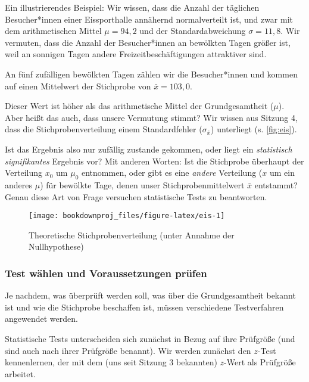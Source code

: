 \documentclass[
  ngerman,
]{article}
\begin{document}
Ein illustrierendes Beispiel: Wir wissen, dass die Anzahl der täglichen Besucher*innen einer Eissporthalle annähernd normalverteilt ist, und zwar mit dem arithmetischen Mittel \(\mu=94{,}2\) und der Standardabweichung \(\sigma=11{,}8\). Wir vermuten, dass die Anzahl der Besucher*innen an bewölkten Tagen größer ist, weil an sonnigen Tagen andere Freizeitbeschäftigungen attraktiver sind.

An fünf zufälligen bewölkten Tagen zählen wir die Besucher*innen und kommen auf einen Mittelwert der Stichprobe von \(\bar{x} = 103{,}0\).

Dieser Wert ist höher als das arithmetische Mittel der Grundgesamtheit (\(\mu\)). Aber heißt das auch, dass unsere Vermutung stimmt? Wir wissen aus Sitzung 4, dass die Stichprobenverteilung einem Standardfehler (\(\sigma_{\bar{x}}\)) unterliegt (s. \autoref{fig:eis}).

Ist das Ergebnis also nur zufällig zustande gekommen, oder liegt ein \emph{statistisch signifikantes} Ergebnis vor? Mit anderen Worten: Ist die Stichprobe überhaupt der Verteilung \(x_0\) um \(\mu_0\) entnommen, oder gibt es eine \emph{andere} Verteilung (\(x\) um ein anderes \(\mu\)) für bewölkte Tage, denen unser Stichprobenmittelwert \(\bar{x}\) entstammt? Genau diese Art von Frage versuchen statistische Tests zu beantworten.

\begin{figure}[h]

{\centering \texttt{[image: bookdownproj\_files/figure-latex/eis-1]} 

}

\caption{Theoretische Stichprobenverteilung (unter Annahme der Nullhypothese)}\label{fig:eis}
\end{figure}

\hypertarget{test-wuxe4hlen-und-voraussetzungen-pruxfcfen}{%
\subsubsection{Test wählen und Voraussetzungen prüfen}\label{test-wuxe4hlen-und-voraussetzungen-pruxfcfen}}

Je nachdem, was überprüft werden soll, was über die Grundgesamtheit bekannt ist und wie die Stichprobe beschaffen ist, müssen verschiedene Testverfahren angewendet werden.

Statistische Tests unterscheiden sich zunächst in Bezug auf ihre Prüfgröße (und sind auch nach ihrer Prüfgröße benannt). Wir werden zunächst den \(z\)-Test kennenlernen, der mit dem (uns seit Sitzung 3 bekannten) \(z\)-Wert als Prüfgröße arbeitet.
\end{document}
